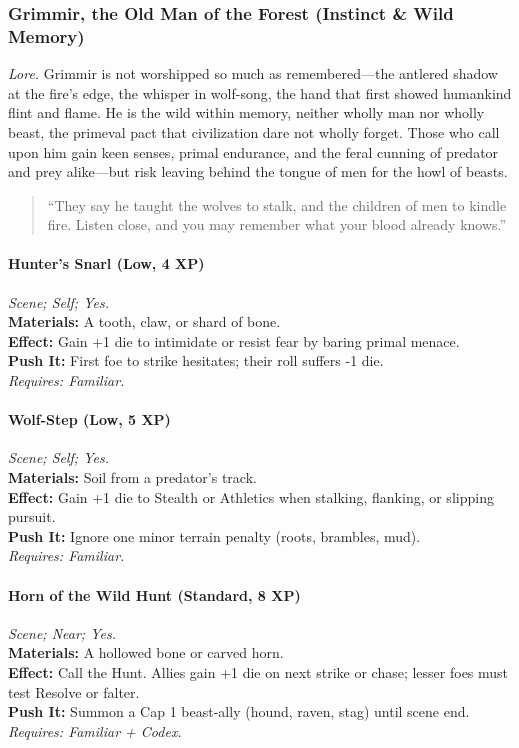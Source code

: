 
\subsubsection{Grimmir, the Old Man of the Forest (Instinct \& Wild Memory)}
\textit{Lore.} Grimmir is not worshipped so much as remembered—the antlered shadow at the fire’s edge, the whisper in wolf-song, the hand that first showed humankind flint and flame. He is the wild within memory, neither wholly man nor wholly beast, the primeval pact that civilization dare not wholly forget. Those who call upon him gain keen senses, primal endurance, and the feral cunning of predator and prey alike—but risk leaving behind the tongue of men for the howl of beasts.

\begin{quote}
“They say he taught the wolves to stalk, and the children of men to kindle fire. Listen close, and you may remember what your blood already knows.”  
\end{quote}

\paragraph*{Hunter’s Snarl (Low, 4 XP)} \emph{Scene; Self; Yes.}\\
\textbf{Materials:} A tooth, claw, or shard of bone.\\
\textbf{Effect:} Gain +1 die to intimidate or resist fear by baring primal menace.\\
\textbf{Push It:} First foe to strike hesitates; their roll suffers -1 die.\\
\emph{Requires: Familiar.}

\paragraph*{Wolf-Step (Low, 5 XP)} \emph{Scene; Self; Yes.}\\
\textbf{Materials:} Soil from a predator’s track.\\
\textbf{Effect:} Gain +1 die to Stealth or Athletics when stalking, flanking, or slipping pursuit.\\
\textbf{Push It:} Ignore one minor terrain penalty (roots, brambles, mud).\\
\emph{Requires: Familiar.}

\paragraph{Horn of the Wild Hunt (Standard, 8 XP)} \emph{Scene; Near; Yes.}\\
\textbf{Materials:} A hollowed bone or carved horn.\\
\textbf{Effect:} Call the Hunt. Allies gain +1 die on next strike or chase; lesser foes must test Resolve or falter.\\
\textbf{Push It:} Summon a Cap 1 beast-ally (hound, raven, stag) until scene end.\\
\emph{Requires: Familiar + Codex.}


